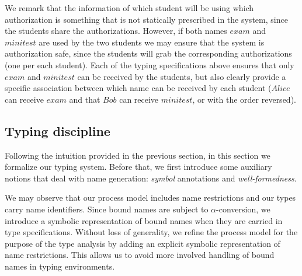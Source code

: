 We remark that the information of which student will be using which 
authorization
is something that is not statically prescribed in the system, since the students share the authorizations. However, if
both names $\mathit{exam}$ and $\mathit{minitest}$ are used by the two students we may ensure that the system is authorization safe, since the students will grab the corresponding authorizations (one per each student). 
%
Each of the typing specifications above ensures that only $\mathit{exam}$ and $\mathit{minitest}$ can be received by the students, but also clearly provide a specific association between which name
can be received by each student ($\mathit{Alice}$ can receive $\mathit{exam}$ and that $\mathit{Bob}$ can receive $\mathit{minitest}${, or with the order reversed}).

\subsection{Typing discipline}\label{sec:typing_discipline}

Following the intuition provided in the previous section, in this section we formalize our typing system.
Before that, 
we first introduce some auxiliary notions that deal with name generation: \emph{symbol} annotations and \emph{well-formedness}.

We may observe that our process model includes name restrictions and our types carry name identifiers. Since bound names are subject to $\alpha$-conversion, we introduce a symbolic representation of bound names when they are carried in type specifications. Without loss of generality, we refine the process model for the purpose of the type analysis by adding an explicit symbolic representation of name restrictions. This allows us to avoid more involved handling of bound names in typing environments. 

